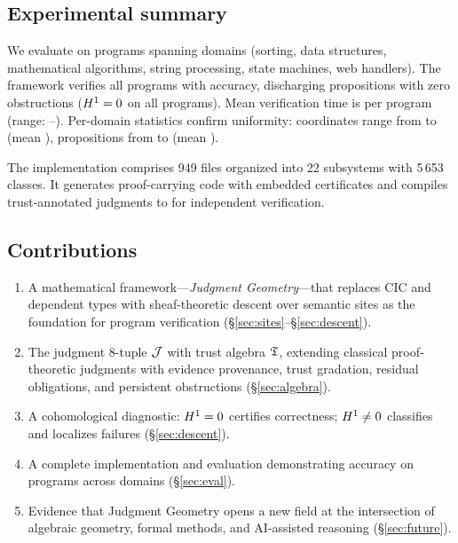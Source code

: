 \subsection{Experimental summary}\label{sec:intro:experiments}

We evaluate \JuGeo{} on \expTotalPrograms{} \Python{} programs spanning
\expDomainCount{} domains (sorting, data structures, mathematical
algorithms, string processing, state machines, web handlers).  The
framework verifies all \expVerified{} programs with \expAccuracy{}
accuracy, discharging \expPropsSum{} propositions with zero obstructions
($H^{1} = 0$ on all \expHOneZero{} programs).  Mean verification
time is \expTimeMean{} per program (range: \expTimeMin{}--\expTimeMax{}).
Per-domain statistics confirm uniformity: coordinates range from
\expCoordsMin{} to \expCoordsMax{} (mean \expCoordsMean{}), propositions
from \expPropsMin{} to \expPropsMax{} (mean \expPropsMean{}).

The implementation comprises 949 \Python{} files organized into 22
subsystems with 5\,653 classes.  It generates proof-carrying \Python{}
code with embedded certificates and compiles trust-annotated judgments to
\LEAN{} for independent verification.

\subsection{Contributions}\label{sec:intro:contributions}

\begin{enumerate}
  \item A mathematical framework---\emph{Judgment Geometry}---that replaces
        CIC and dependent types with sheaf-theoretic descent over semantic
        sites as the foundation for program verification (\S\ref{sec:sites}--\S\ref{sec:descent}).
  \item The judgment 8-tuple $\mathcal{J}$ with trust algebra $\mathfrak{T}$, extending
        classical proof-theoretic judgments with evidence provenance, trust
        gradation, residual obligations, and persistent obstructions
        (\S\ref{sec:algebra}).
  \item A cohomological diagnostic: $H^{1} = 0$ certifies correctness;
        $H^{1} \neq 0$ classifies and localizes failures
        (\S\ref{sec:descent}).
  \item A complete implementation and evaluation demonstrating
        \expAccuracy{} accuracy on \expTotalPrograms{} programs across
        \expDomainCount{} domains (\S\ref{sec:eval}).
  \item Evidence that Judgment Geometry opens a new field at the
        intersection of algebraic geometry, formal methods, and AI-assisted
        reasoning (\S\ref{sec:future}).
\end{enumerate}


